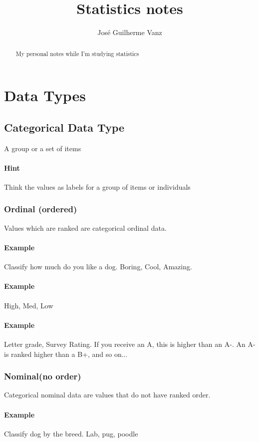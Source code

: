 \documentclass[]{article}
\title{Statistics notes}
\author{José Guilherme Vanz}
\begin{document}
\maketitle

\begin{abstract}
My personal notes while I'm studying statistics
\end{abstract}

\section{Data Types}

\subsection{Categorical Data Type}
A group or a set of items
\paragraph{Hint} Think the values as labels for a group of items or individuals
\subsubsection{Ordinal (ordered)}
Values which are ranked are categorical ordinal data. 
\paragraph{Example} Classify how much do you like a dog. Boring, Cool, Amazing. 
\paragraph{Example} High, Med, Low
\paragraph{Example} Letter grade, Survey Rating. If you receive an A, this is higher than an A-. An A- is ranked higher than a B+, and so on...

\subsubsection{Nominal(no order)}
Categorical nominal data are values that do not have ranked order.
\paragraph{Example} Classify dog by the breed. Lab, pug, poodle
\end{document}
